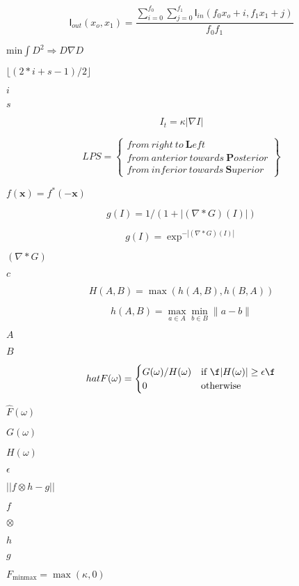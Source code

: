 \documentclass{article}
\begin{document}
\[ \mathsf{I}_{out}(x_o,x_1) = \frac{\sum_{i=0}^{f_0}\sum_{j=0}^{f_1}\mathsf{I}_{in}(f_0 x_o+i,f_1 x_1+j)}{f_0 f_1} \]
\pagebreak

$ \mbox{min} \int D^2 \Rightarrow D \nabla D $
\pagebreak

$ \lfloor (2*i+s-1)/2 \rfloor $
\pagebreak

$i$
\pagebreak

$s$
\pagebreak

\[ I_t = \kappa |\nabla I| \]
\pagebreak

\[ LPS = \begin{Bmatrix} from\ right\ to\ \textbf{L}eft \\ from\ anterior\ towards\ \textbf{P}osterior \\ from\ inferior\ towards\ \textbf{S}uperior \end{Bmatrix} \]
\pagebreak

$ f(\mathbf{x}) = f^*(-\mathbf{x}) $
\pagebreak

\[ g(I) = 1 / ( 1 + | (\nabla * G)(I)| ) \]
\pagebreak

\[ g(I) = \exp^{-|(\nabla * G)(I)|} \]
\pagebreak

$ (\nabla * G) $
\pagebreak

$ c $
\pagebreak

\[ H(A,B) = \max(h(A,B),h(B,A)) \]
\pagebreak

\[ h(A,B) = \max_{a \in A} \min_{b \in B} \| a - b\| \]
\pagebreak

$A$
\pagebreak

$B$
\pagebreak

\[ hat{F}(\omega) = \begin{cases} G(\omega) / H(\omega) & \text{if \f$|H(\omega)| \geq \epsilon\f$} \\ 0 & \text{otherwise} \end{cases} \]
\pagebreak

$\hat{F}(\omega)$
\pagebreak

$G(\omega)$
\pagebreak

$H(\omega)$
\pagebreak

$\epsilon$
\pagebreak

$||f \otimes h - g||$
\pagebreak

$f$
\pagebreak

$\otimes$
\pagebreak

$h$
\pagebreak

$g$
\pagebreak

$ F_{\mbox{minmax}} = \max(\kappa,0) $
\pagebreak
\end{document}
